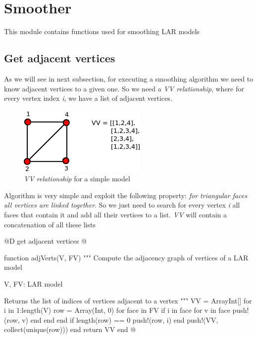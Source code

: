 \documentclass[11pt,oneside]{article}	%
\begin{document}
\section{Smoother}\label{sec:Smoother}
This module contains functions used for smoothing LAR models

\subsection{Get adjacent vertices}\label{sec:adjacent}

As we will see in next subsection, for executing a smoothing algorithm we need to know adjacent vertices to a given one. So we need a \textit{VV relationship}, where for every vertex index \textit{i}, we have a list of adjacent vertices.

\begin{figure}[htb] %
   \centering
   \includegraphics[width=0.40\linewidth]{images/Adjacents.png}
   \caption{\textit{VV relationship} for a simple model}
   \label{fig:adjacents}
\end{figure}

Algorithm is very simple and exploit the following property: \textit{for triangular faces all vertices are linked together}. So we just need to search for every vertex \textit{i} all faces that contain it and add all their vertices to a list. \textit{VV} will contain a concatenation of all these lists

@D get adjacent vertices
@{function adjVerts(V, FV)
  """
  Compute the adjacency graph of vertices
  of a LAR model

  V, FV: LAR model

  Returns the list of indices of vertices adjacent
  to a vertex
  """
  VV = Array{Int}[]
  for i in 1:length(V)
    row = Array(Int, 0)
    for face in FV
      if i in face
        for v in face
          push!(row, v)
        end
      end
    end
    if length(row) == 0
      push!(row, i)
    end
    push!(VV, collect(unique(row)))
  end
  return VV
end @}
\end{document}
